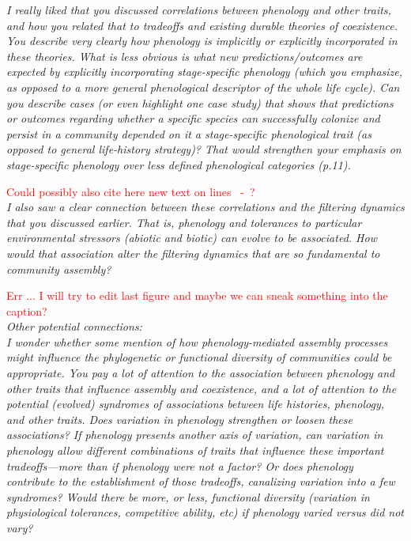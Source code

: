 \documentclass[11pt]{article}
\newcommand{\lr}[1]{~\lineref{#1}}
\begin{document}
\emph{I really liked that you discussed correlations between phenology and other traits, and how you related that to tradeoffs and existing durable theories of coexistence. You describe very clearly how phenology is implicitly or explicitly incorporated in these theories. What is less obvious is what new predictions/outcomes are expected by explicitly incorporating stage-specific phenology (which you emphasize, as opposed to a more general phenological descriptor of the whole life cycle). Can you describe cases (or even highlight one case study) that shows that predictions or outcomes regarding whether a specific species can successfully colonize and persist in a community depended on it a stage-specific phenological trait (as opposed to general life-history strategy)? That would strengthen your emphasis on stage-specific phenology over less defined phenological categories (p.11).}

\textcolor{red}{Could possibly also cite here new text on lines \lr{definestorage4S}-\lr{definestorage4E}?}\\

\emph{I also saw a clear connection between these correlations and the filtering dynamics that you discussed earlier. That is, phenology and tolerances to particular environmental stressors (abiotic and biotic) can evolve to be associated. How would that association alter the filtering dynamics that are so fundamental to community assembly?}

\textcolor{red}{Err ... I will try to edit last figure and maybe we can sneak something into the caption?}\\


\emph{Other potential connections:\\
I wonder whether some mention of how phenology-mediated assembly processes might influence the phylogenetic or functional diversity of communities could be appropriate. You pay a lot of attention to the association between phenology and other traits that influence assembly and coexistence, and a lot of attention to the potential (evolved) syndromes of associations between life histories, phenology, and other traits. Does variation in phenology strengthen or loosen these associations? If phenology presents another axis of variation, can variation in phenology allow different combinations of traits that influence these important tradeoffs—more than if phenology were not a factor? Or does phenology contribute to the establishment of those tradeoffs, canalizing variation into a few syndromes? Would there be more, or less, functional diversity (variation in physiological tolerances, competitive ability, etc) if phenology varied versus did not vary?}
\end{document}
